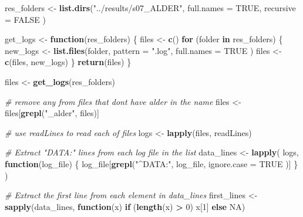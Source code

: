 \documentclass[
]{article}
\newenvironment{Shaded}{\begin{snugshade}}{\end{snugshade}}
\newcommand{\AttributeTok}[1]{\textcolor[rgb]{0.13,0.29,0.53}{#1}}
\newcommand{\CommentTok}[1]{\textcolor[rgb]{0.56,0.35,0.01}{\textit{#1}}}
\newcommand{\ConstantTok}[1]{\textcolor[rgb]{0.56,0.35,0.01}{#1}}
\newcommand{\ControlFlowTok}[1]{\textcolor[rgb]{0.13,0.29,0.53}{\textbf{#1}}}
\newcommand{\DecValTok}[1]{\textcolor[rgb]{0.00,0.00,0.81}{#1}}
\newcommand{\FunctionTok}[1]{\textcolor[rgb]{0.13,0.29,0.53}{\textbf{#1}}}
\newcommand{\NormalTok}[1]{#1}
\newcommand{\OtherTok}[1]{\textcolor[rgb]{0.56,0.35,0.01}{#1}}
\newcommand{\SpecialCharTok}[1]{\textcolor[rgb]{0.81,0.36,0.00}{\textbf{#1}}}
\newcommand{\StringTok}[1]{\textcolor[rgb]{0.31,0.60,0.02}{#1}}
\begin{document}
\begin{Shaded}
\begin{Highlighting}[]
\NormalTok{res\_folders }\OtherTok{\textless{}{-}} \FunctionTok{list.dirs}\NormalTok{(}\StringTok{"../results/s07\_ALDER"}\NormalTok{,}
  \AttributeTok{full.names =} \ConstantTok{TRUE}\NormalTok{,}
  \AttributeTok{recursive =} \ConstantTok{FALSE}
\NormalTok{)}

\NormalTok{get\_logs }\OtherTok{\textless{}{-}} \ControlFlowTok{function}\NormalTok{(res\_folders) \{}
\NormalTok{  files }\OtherTok{\textless{}{-}} \FunctionTok{c}\NormalTok{()}
  \ControlFlowTok{for}\NormalTok{ (folder }\ControlFlowTok{in}\NormalTok{ res\_folders) \{}
\NormalTok{    new\_logs }\OtherTok{\textless{}{-}} \FunctionTok{list.files}\NormalTok{(folder,}
      \AttributeTok{pattern =} \StringTok{".log"}\NormalTok{,}
      \AttributeTok{full.names =} \ConstantTok{TRUE}
\NormalTok{    )}
\NormalTok{    files }\OtherTok{\textless{}{-}} \FunctionTok{c}\NormalTok{(files, new\_logs)}
\NormalTok{  \}}
  \FunctionTok{return}\NormalTok{(files)}
\NormalTok{\}}

\NormalTok{files }\OtherTok{\textless{}{-}} \FunctionTok{get\_logs}\NormalTok{(res\_folders)}



\CommentTok{\# remove any from files that don\textquotesingle{}t have \textquotesingle{}alder\textquotesingle{} in  the name}
\NormalTok{files }\OtherTok{\textless{}{-}}\NormalTok{ files[}\FunctionTok{grepl}\NormalTok{(}\StringTok{"\_alder"}\NormalTok{, files)]}

\CommentTok{\# use readLines to read each of files}
\NormalTok{logs }\OtherTok{\textless{}{-}} \FunctionTok{lapply}\NormalTok{(files, readLines)}

\CommentTok{\# Extract "DATA:" lines from each log file in the list}
\NormalTok{data\_lines }\OtherTok{\textless{}{-}} \FunctionTok{lapply}\NormalTok{(}
\NormalTok{  logs,}
  \ControlFlowTok{function}\NormalTok{(log\_file) \{}
\NormalTok{    log\_file[}\FunctionTok{grepl}\NormalTok{(}\StringTok{"\^{}DATA:"}\NormalTok{,}
\NormalTok{      log\_file,}
      \AttributeTok{ignore.case =} \ConstantTok{TRUE}
\NormalTok{    )]}
\NormalTok{  \}}
\NormalTok{)}


\CommentTok{\# Extract the first line from each element in data\_lines}
\NormalTok{first\_lines }\OtherTok{\textless{}{-}} \FunctionTok{sapply}\NormalTok{(data\_lines, }\ControlFlowTok{function}\NormalTok{(x) }\ControlFlowTok{if}\NormalTok{ (}\FunctionTok{length}\NormalTok{(x) }\SpecialCharTok{\textgreater{}} \DecValTok{0}\NormalTok{) x[}\DecValTok{1}\NormalTok{] }\ControlFlowTok{else} \ConstantTok{NA}\NormalTok{)}


\end{Highlighting}
\end{Shaded}
\end{document}
